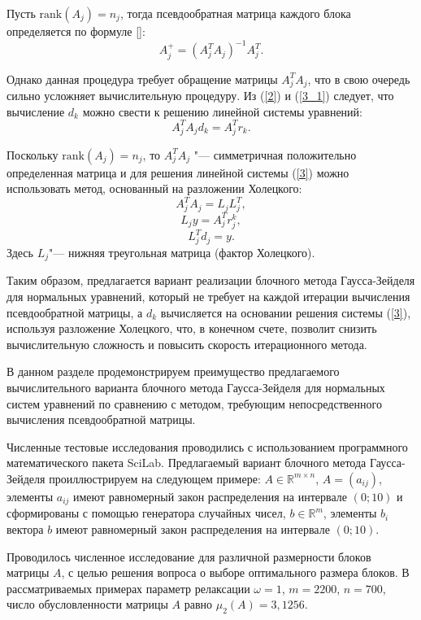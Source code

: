 Пусть $\mathrm{rank}(A_{j})=n_{j}$, тогда псевдообратная матрица каждого блока определяется по формуле []:
\begin{equation}
A^{+}_{j}=(A^{T}_{j}A_{j})^{-1}A^{T}_{j}.
 \label{3_1}
\end{equation}

Однако данная процедура требует обращение матрицы $A^{T}_{j}A_{j}$, что в свою очередь сильно усложняет вычислительную процедуру. Из (\ref{2}) и (\ref{3_1}) следует, что вычисление $d_{k}$ можно свести к решению линейной системы уравнений:
\begin{equation}
A_{j}^{T}A_{j}d_{k}=A_{j}^{T}r_{k}.\label{3}
\end{equation}

Поскольку $\mathrm{rank}(A_{j})=n_{j}$, то $A_{j}^{T}A_{j}$
"--- симметричная положительно определенная матрица и для решения линейной системы (\ref{3}) можно использовать метод, основанный на разложении Холецкого:
\[
A_{j}^{T}A_{j}=L_{j}L_{j}^{T},
\]
\[
L_{j}y=A_{j}^{T}r_{j}^{k},
\]
\[
L_{j}^{T}d_{j}=y.
\]
Здесь $L_{j}$"--- нижняя треугольная матрица (фактор Холецкого).

Таким образом, предлагается вариант реализации блочного метода Гаусса-Зейделя для нормальных уравнений, который не требует на каждой итерации вычисления псевдообратной матрицы, а $d_{k}$ вычисляется на основании решения системы (\ref{3}), используя разложение Холецкого, что, в конечном счете, позволит снизить вычислительную сложность и повысить скорость итерационного метода.


В данном разделе продемонстрируем преимущество предлагаемого вычислительного варианта блочного метода Гаусса-Зейделя для нормальных систем уравнений по сравнению с методом, требующим непосредственного вычисления псевдообратной матрицы.

Численные тестовые исследования проводились с использованием программного математического пакета SciLab. Предлагаемый вариант блочного метода Гаусса-Зейделя проиллюстрируем на следующем примере: $A\in \mathbb{R}^{m\times n}$, $A=(a_{ij})$, элементы $a_{ij}$ имеют равномерный закон распределения на интервале $(0;10)$ и сформированы с помощью генератора случайных чисел,  $b\in \mathbb{R}^{m}$, элементы $b_{i}$ вектора $b$ имеют равномерный закон распределения на интервале $(0;10)$.

Проводилось численное исследование для различной размерности блоков матрицы $A$, с целью решения вопроса о выборе оптимального размера блоков. В рассматриваемых примерах параметр релаксации $\omega=1$, $m=2200$, $n=700$, число обусловленности матрицы $A$ равно $\mu_{2}(A)=3,1256$.

